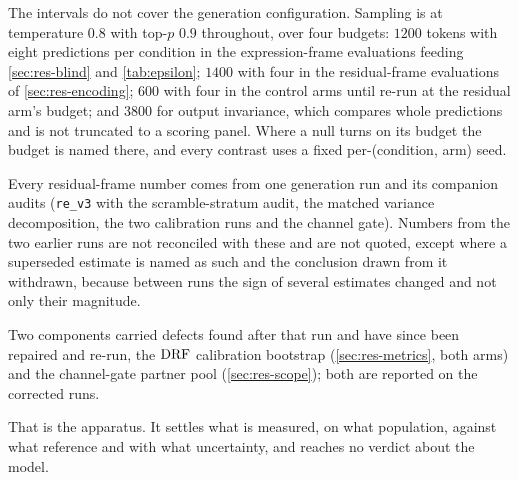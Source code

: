 The intervals do not cover the generation configuration. Sampling is at
temperature $0.8$ with top-$p$ $0.9$ throughout, over four budgets: $1200$
tokens with eight predictions per condition in the expression-frame evaluations
feeding \cref{sec:res-blind} and \cref{tab:epsilon}; $1400$ with four in the
residual-frame evaluations of \cref{sec:res-encoding}; $600$ with four in the
control arms until re-run at the residual arm's budget; and $3800$ for output
invariance, which compares whole predictions and is not truncated to a scoring
panel. Where a null turns on its budget the budget is named there, and every
contrast uses a fixed per-(condition, arm) seed.

\begin{scopelimit}
Every residual-frame number comes from one generation run and its companion
audits (\texttt{re\_v3} with the scramble-stratum audit, the matched variance
decomposition, the two calibration runs and the channel gate). Numbers from the
two earlier runs are not reconciled with these and are not quoted, except where
a superseded estimate is named as such and the conclusion drawn from it
withdrawn, because between runs the sign of several estimates changed and not
only their magnitude.
\end{scopelimit}

Two components carried defects found after that run and have since been repaired
and re-run, the $\textrm{DRF}$ calibration bootstrap (\cref{sec:res-metrics}, both arms)
and the channel-gate partner pool (\cref{sec:res-scope}); both are reported on
the corrected runs.

That is the apparatus. It settles what is measured, on what population, against
what reference and with what uncertainty, and reaches no verdict about the
model.
